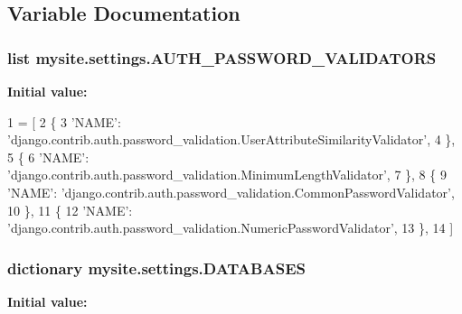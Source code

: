 \subsection{Variable Documentation}
\hypertarget{namespacemysite_1_1settings_ae1a1bb374bc9383cde47414d4aaa23bc}{
\subsubsection[{A\-U\-T\-H\-\_\-\-P\-A\-S\-S\-W\-O\-R\-D\-\_\-\-V\-A\-L\-I\-D\-A\-T\-O\-R\-S}]{\setlength{\rightskip}{0pt plus 5cm}list mysite.\-settings.\-A\-U\-T\-H\-\_\-\-P\-A\-S\-S\-W\-O\-R\-D\-\_\-\-V\-A\-L\-I\-D\-A\-T\-O\-R\-S}}\label{namespacemysite_1_1settings_ae1a1bb374bc9383cde47414d4aaa23bc}
{\bfseries Initial value\-:}
\begin{DoxyCode}
1 = [
2     \{
3         \textcolor{stringliteral}{'NAME'}: \textcolor{stringliteral}{'django.contrib.auth.password\_validation.UserAttributeSimilarityValidator'},
4     \},
5     \{
6         \textcolor{stringliteral}{'NAME'}: \textcolor{stringliteral}{'django.contrib.auth.password\_validation.MinimumLengthValidator'},
7     \},
8     \{
9         \textcolor{stringliteral}{'NAME'}: \textcolor{stringliteral}{'django.contrib.auth.password\_validation.CommonPasswordValidator'},
10     \},
11     \{
12         \textcolor{stringliteral}{'NAME'}: \textcolor{stringliteral}{'django.contrib.auth.password\_validation.NumericPasswordValidator'},
13     \},
14 ]
\end{DoxyCode}
\hypertarget{namespacemysite_1_1settings_a04300628acd12c08ea63ee5f9d3d83d1}{
\subsubsection[{D\-A\-T\-A\-B\-A\-S\-E\-S}]{\setlength{\rightskip}{0pt plus 5cm}dictionary mysite.\-settings.\-D\-A\-T\-A\-B\-A\-S\-E\-S}}\label{namespacemysite_1_1settings_a04300628acd12c08ea63ee5f9d3d83d1}
{\bfseries Initial value\-:}
